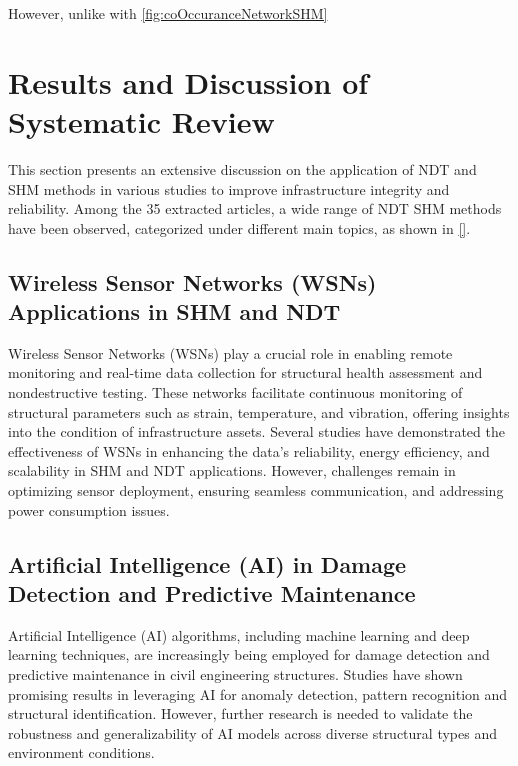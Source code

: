 \documentclass[journal, a4paper]{IEEEtran}
\begin{document}
However, unlike with \autoref{fig:coOccuranceNetworkSHM} \lipsum[1]





\section{Results and Discussion of Systematic Review}
This section presents an extensive discussion on the application of NDT
and SHM methods in various studies to improve infrastructure integrity and reliability.
Among the 35 extracted articles, a wide range of NDT SHM methods have been observed, categorized under different main topics,
as shown in \autoref{}. 

\subsection{Wireless Sensor Networks (WSNs) Applications in SHM and NDT}
Wireless Sensor Networks (WSNs) play a crucial role in enabling remote monitoring and real-time data collection for
structural health assessment and nondestructive testing. These networks facilitate continuous monitoring of structural
parameters such as strain, temperature, and vibration, offering insights into the condition of infrastructure assets.
Several studies \cite{kang_robotic-based_2021} \cite{katunin_modeling_2021} \cite{fang_structural_2024} have demonstrated the effectiveness of WSNs in enhancing the data’s reliability, energy
efficiency, and scalability in SHM and NDT applications. However, challenges remain in optimizing sensor deployment,
ensuring seamless communication, and addressing power consumption issues.

\subsection{Artificial Intelligence (AI) in Damage Detection and Predictive Maintenance}
Artificial Intelligence (AI) algorithms, including machine learning and deep learning techniques,
are increasingly being employed for damage detection and predictive maintenance in civil engineering structures.
Studies \cite{yang_broadband_2023} \cite{cawley_guided_2024} \cite{zhang_defect_2020} have shown promising results in leveraging AI for anomaly detection,
pattern recognition and structural identification.
However, further research is needed to validate the robustness and generalizability of
AI models across diverse structural types and environment conditions.
\end{document}
